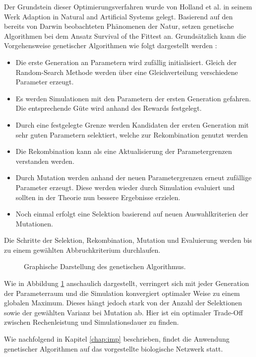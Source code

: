 		Der Grundstein dieser Optimierungsverfahren wurde von Holland et al. in seinem Werk \glqq Adaption in Natural and Artificial Systems\grqq{} \cite{Holland1992} gelegt. Basierend auf den bereits von Darwin\cite{Darwin1859} beobachteten Phänomenen der Natur, setzen genetische Algorithmen bei dem Ansatz \glqq Survival of the Fittest\grqq{} an. Grundsätzlich kann die Vorgehensweise genetischer Algorithmen wie folgt dargestellt werden \cite{Goldberg1989}:
		\begin{itemize}
			\item Die erste Generation an Parametern wird zufällig initialisiert. Gleich der Random-Search Methode werden über eine Gleichverteilung verschiedene Parameter erzeugt.
			\item Es werden Simulationen mit den Parametern der ersten Generation gefahren. Die entsprechende Güte wird anhand des Rewards festgelegt.
			\item Durch eine festgelegte Grenze werden Kandidaten der ersten Generation mit sehr guten Parametern selektiert, welche zur Rekombination genutzt werden
			\item Die Rekombination kann als eine Aktualisierung der Parametergrenzen verstanden werden.
			\item Durch Mutation werden anhand der neuen Parametergrenzen erneut zufällige Parameter erzeugt. Diese werden wieder durch Simulation evaluiert und sollten in der Theorie nun bessere Ergebnisse erzielen.
			\item Noch einmal erfolgt eine Selektion basierend auf neuen Auswahlkriterien der Mutationen.
		\end{itemize}
		Die Schritte der Selektion, Rekombination, Mutation und Evaluierung werden bis zu einem gewählten Abbruchkriterium durchlaufen.
		\begin{figure}[H] %
			\centering
			\def\svgwidth{12cm}
			
			\caption{Graphische Darstellung des genetischen Algorithmus.}
			\label{fig:gen_chart}
		\end{figure}
		Wie in Abbildung \ref{fig:gen_chart} anschaulich dargestellt, verringert sich mit jeder Generation der Parameterraum und die Simulation konvergiert optimaler Weise zu einem globalen Maximum. Dieses hängt jedoch stark von der Anzahl der Selektionen sowie der gewählten Varianz bei Mutation ab. Hier ist ein optimaler Trade-Off zwischen Rechenleistung und Simulationsdauer zu finden.
		
		Wie nachfolgend in Kapitel \ref{chap:imp} beschrieben, findet die Anwendung genetischer Algorithmen auf das vorgestellte biologische Netzwerk statt.
	
